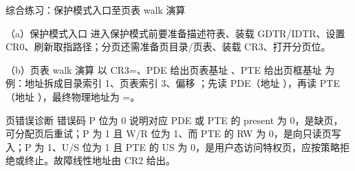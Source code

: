 \begin{chapteranswer}{综合练习：保护模式入口至页表 walk 演算}
\begin{answersubproblem}{（a）保护模式入口}
进入保护模式前要准备描述符表、装载 GDTR/IDTR、设置 CR0、刷新取指路径；分页还需准备页目录/页表、装载 CR3、打开分页位。
\end{answersubproblem}
\begin{answersubproblem}{（b）页表 walk 演算}
以 CR3=、PDE 给出页表基址 、PTE 给出页框基址  为例：地址拆成目录索引 1、页表索引 3、偏移 ；先读 PDE（地址 ），再读 PTE（地址 ），最终物理地址为 =。
\end{answersubproblem}
\end{chapteranswer}

\begin{chapteranswer}{页错误诊断}
错误码 P 位为 0 说明对应 PDE 或 PTE 的 present 为 0，是缺页，可分配页后重试；P 为 1 且 W/R 位为 1、而 PTE 的 RW 为 0，是向只读页写入；P 为 1、U/S 位为 1 且 PTE 的 US 为 0，是用户态访问特权页，应按策略拒绝或终止。故障线性地址由 CR2 给出。
\end{chapteranswer}

